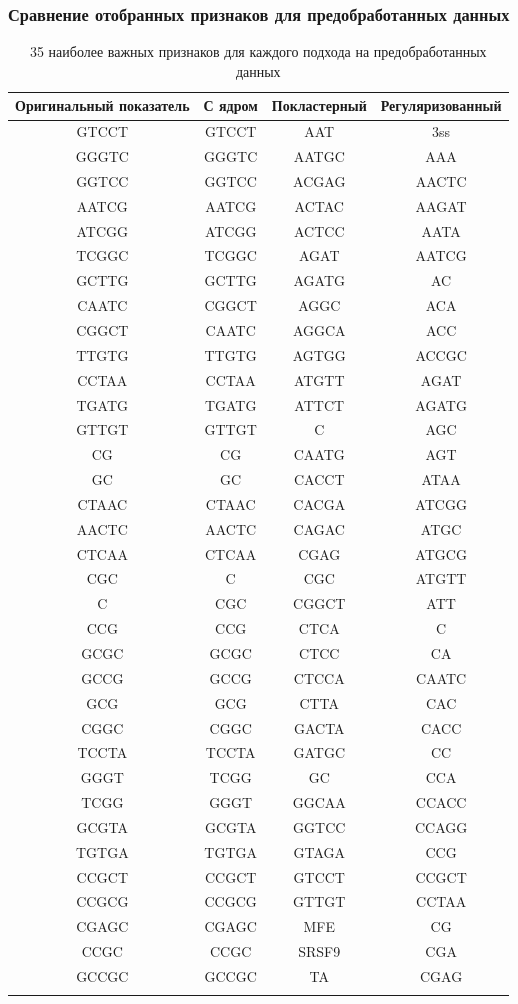 \subsubsection{Сравнение отобранных признаков для предобработанных данных}

\begin{longtable}{|c|c|c|c|}
	\hline
	Оригинальный показатель & С ядром & Покластерный & Регуляризованный \\ \hline
	GTCCT & GTCCT & AAT & 3ss \\ \hline
GGGTC & GGGTC & AATGC & AAA \\ \hline
GGTCC & GGTCC & ACGAG & AACTC  \\ \hline
AATCG & AATCG & ACTAC & AAGAT  \\ \hline
ATCGG & ATCGG & ACTCC & AATA  \\ \hline
TCGGC & TCGGC & AGAT & AATCG  \\ \hline
GCTTG & GCTTG & AGATG & AC  \\ \hline
CAATC & CGGCT & AGGC & ACA  \\ \hline
CGGCT & CAATC & AGGCA & ACC  \\ \hline
TTGTG & TTGTG & AGTGG & ACCGC  \\ \hline
CCTAA & CCTAA & ATGTT & AGAT  \\ \hline
TGATG & TGATG & ATTCT & AGATG  \\ \hline
GTTGT & GTTGT & C & AGC  \\ \hline
CG & CG & CAATG & AGT  \\ \hline
GC & GC & CACCT & ATAA  \\ \hline
CTAAC & CTAAC & CACGA & ATCGG  \\ \hline
AACTC & AACTC & CAGAC & ATGC  \\ \hline
CTCAA & CTCAA & CGAG & ATGCG  \\ \hline
CGC & C & CGC & ATGTT  \\ \hline
C & CGC & CGGCT & ATT  \\ \hline
CCG & CCG & CTCA & C  \\ \hline
GCGC & GCGC & CTCC & CA  \\ \hline
GCCG & GCCG & CTCCA & CAATC  \\ \hline
GCG & GCG & CTTA & CAC  \\ \hline
CGGC & CGGC & GACTA & CACC  \\ \hline
TCCTA & TCCTA & GATGC & CC  \\ \hline
GGGT & TCGG & GC & CCA  \\ \hline
TCGG & GGGT & GGCAA & CCACC  \\ \hline
GCGTA & GCGTA & GGTCC & CCAGG  \\ \hline
TGTGA & TGTGA & GTAGA & CCG \\ \hline
CCGCT & CCGCT & GTCCT & CCGCT  \\ \hline
CCGCG & CCGCG & GTTGT & CCTAA  \\ \hline
CGAGC & CGAGC & MFE & CG  \\ \hline
CCGC & CCGC & SRSF9 & CGA  \\ \hline
GCCGC & GCCGC & TA & CGAG  \\ \hline
\caption{35 наиболее важных признаков для каждого подхода на предобработанных данных}
\label{features_norm}
\end{longtable}

